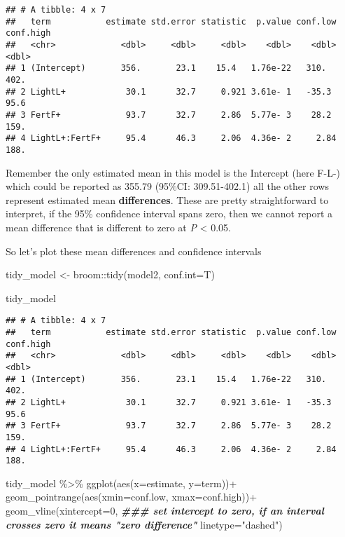 \documentclass[
]{article}
\newenvironment{Shaded}{\begin{snugshade}}{\end{snugshade}}
\newcommand{\AttributeTok}[1]{\textcolor[rgb]{0.77,0.63,0.00}{#1}}
\newcommand{\DecValTok}[1]{\textcolor[rgb]{0.00,0.00,0.81}{#1}}
\newcommand{\DocumentationTok}[1]{\textcolor[rgb]{0.56,0.35,0.01}{\textbf{\textit{#1}}}}
\newcommand{\FunctionTok}[1]{\textcolor[rgb]{0.00,0.00,0.00}{#1}}
\newcommand{\NormalTok}[1]{#1}
\newcommand{\OtherTok}[1]{\textcolor[rgb]{0.56,0.35,0.01}{#1}}
\newcommand{\SpecialCharTok}[1]{\textcolor[rgb]{0.00,0.00,0.00}{#1}}
\newcommand{\StringTok}[1]{\textcolor[rgb]{0.31,0.60,0.02}{#1}}
\begin{document}
\begin{verbatim}
## # A tibble: 4 x 7
##   term           estimate std.error statistic  p.value conf.low conf.high
##   <chr>             <dbl>     <dbl>     <dbl>    <dbl>    <dbl>     <dbl>
## 1 (Intercept)       356.       23.1    15.4   1.76e-22   310.       402. 
## 2 LightL+            30.1      32.7     0.921 3.61e- 1   -35.3       95.6
## 3 FertF+             93.7      32.7     2.86  5.77e- 3    28.2      159. 
## 4 LightL+:FertF+     95.4      46.3     2.06  4.36e- 2     2.84     188.
\end{verbatim}

Remember the only estimated mean in this model is the Intercept (here
F-L-) which could be reported as 355.79 (95\%CI: 309.51-402.1) all the
other rows represent estimated mean \textbf{differences}. These are
pretty straightforward to interpret, if the 95\% confidence interval
spans zero, then we cannot report a mean difference that is different to
zero at \emph{P} \textless{} 0.05.

So let's plot these mean differences and confidence intervals

\begin{Shaded}
\begin{Highlighting}[]
\NormalTok{tidy\_model }\OtherTok{\textless{}{-}}\NormalTok{ broom}\SpecialCharTok{::}\FunctionTok{tidy}\NormalTok{(model2, }\AttributeTok{conf.int=}\NormalTok{T) }

\NormalTok{tidy\_model}
\end{Highlighting}
\end{Shaded}

\begin{verbatim}
## # A tibble: 4 x 7
##   term           estimate std.error statistic  p.value conf.low conf.high
##   <chr>             <dbl>     <dbl>     <dbl>    <dbl>    <dbl>     <dbl>
## 1 (Intercept)       356.       23.1    15.4   1.76e-22   310.       402. 
## 2 LightL+            30.1      32.7     0.921 3.61e- 1   -35.3       95.6
## 3 FertF+             93.7      32.7     2.86  5.77e- 3    28.2      159. 
## 4 LightL+:FertF+     95.4      46.3     2.06  4.36e- 2     2.84     188.
\end{verbatim}

\begin{Shaded}
\begin{Highlighting}[]
\NormalTok{tidy\_model }\SpecialCharTok{\%\textgreater{}\%} 
  \FunctionTok{ggplot}\NormalTok{(}\FunctionTok{aes}\NormalTok{(}\AttributeTok{x=}\NormalTok{estimate, }
             \AttributeTok{y=}\NormalTok{term))}\SpecialCharTok{+}
  \FunctionTok{geom\_pointrange}\NormalTok{(}\FunctionTok{aes}\NormalTok{(}\AttributeTok{xmin=}\NormalTok{conf.low, }
                      \AttributeTok{xmax=}\NormalTok{conf.high))}\SpecialCharTok{+}
  \FunctionTok{geom\_vline}\NormalTok{(}\AttributeTok{xintercept=}\DecValTok{0}\NormalTok{,         }\DocumentationTok{\#\#\# set intercept to zero, if an interval crosses zero it means "zero difference"}
             \AttributeTok{linetype=}\StringTok{"dashed"}\NormalTok{)}
\end{Highlighting}
\end{Shaded}
\end{document}
